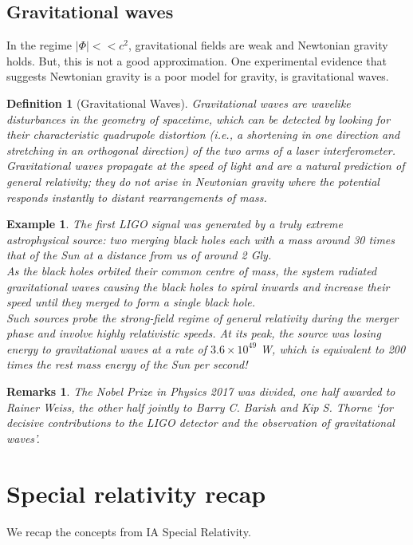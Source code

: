 \documentclass[a4paper]{article}
\newtheorem{eg}{Example}[section]
\newtheorem{remarks}{Remarks}[section]
\theoremstyle{new}
\newtheorem{defi}{Definition}[section]
\begin{document}
\subsection{Gravitational waves}
In the regime $|\Phi|<<c^2$, gravitational fields are weak and Newtonian gravity holds. But, this is not a good approximation. One experimental evidence that suggests Newtonian gravity is a poor model for gravity, is gravitational waves.
\begin{defi}[Gravitational Waves]
Gravitational waves are wavelike disturbances in the geometry of spacetime, which can be detected by looking for their characteristic quadrupole distortion (i.e., a shortening in one direction and stretching in an orthogonal direction) of the two arms of a laser interferometer.\\[5pt]
Gravitational waves propagate at the speed of light and are a natural prediction of general relativity; they do not arise in Newtonian gravity where the potential responds instantly to distant rearrangements of mass.
\end{defi}
\begin{eg}
The first LIGO signal was generated by a truly extreme astrophysical source: two merging black holes each with a mass around 30 times that of the Sun at a distance from us of around 2 Gly.\\[5pt]
As the black holes orbited their common centre of mass, the system radiated gravitational waves causing the black holes to spiral inwards and increase their speed until they merged to form a single black hole.\\[5pt]
Such sources probe the strong-field regime of general relativity during the merger phase and involve highly relativistic speeds. At its peak, the source was losing energy to gravitational waves at a rate of $3.6\times10^{49}$ W, which is equivalent to 200 times the rest mass energy of the Sun per second!
\end{eg}
\begin{remarks}
The Nobel Prize in Physics 2017 was divided, one half awarded to Rainer Weiss, the other half jointly to Barry C. Barish and Kip S. Thorne `for decisive contributions to the LIGO detector and the observation of gravitational waves'.
\end{remarks}
\newpage
\section{Special relativity recap}
We recap the concepts from IA Special Relativity.
\end{document}
